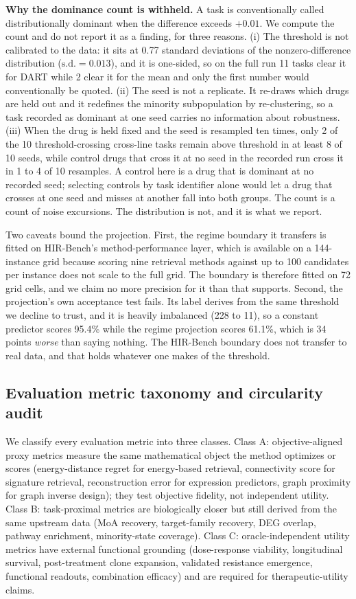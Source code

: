 \documentclass[11pt,letterpaper]{article}
\newcommand{\CONTROLRANGE}{1 to 4}
\begin{document}
\textbf{Why the dominance count is withheld.} A task is conventionally called
distributionally dominant when the difference exceeds $+0.01$. We compute the count and do
not report it as a finding, for three reasons. (i) The threshold is not calibrated to the
data: it sits at 0.77 standard deviations of the nonzero-difference distribution
($\mathrm{s.d.} = 0.013$), and it is one-sided, so on the full run 11 tasks clear it for DART
while 2 clear it for the mean and only the first number would conventionally be quoted.
(ii) The seed is not a replicate. It re-draws which drugs are held out and it redefines the
minority subpopulation by re-clustering, so a task recorded as dominant at one seed carries
no information about robustness. (iii) When the drug is held fixed and the seed is resampled
ten times, only 2 of the 10 threshold-crossing cross-line tasks remain above threshold in at
least 8 of 10 seeds, while control drugs that cross it at no seed in the recorded run cross
it in \CONTROLRANGE{} of 10 resamples. A control here is a drug that is dominant at no
recorded seed; selecting controls by task identifier alone would let a drug that crosses at
one seed and misses at another fall into both groups. The count is a count of noise
excursions. The distribution is not, and it is what we report.

Two caveats bound the projection. First, the regime boundary it
transfers is fitted on HIR-Bench's method-performance layer, which is available on a
144-instance grid because scoring nine retrieval methods against up to 100 candidates per
instance does not scale to the full grid. The boundary is therefore fitted on 72 grid cells,
and we claim no more precision for it than that supports. Second, the projection's own
acceptance test fails. Its label derives from the same threshold we decline to trust, and it is heavily imbalanced
(228 to 11), so a constant predictor scores 95.4\% while the regime projection scores 61.1\%,
which is 34 points \emph{worse} than saying nothing. The HIR-Bench boundary does not transfer
to real data, and that holds whatever one makes of the threshold.

\subsection*{Evaluation metric taxonomy and circularity audit}

We classify every evaluation metric into three classes. Class A: objective-aligned
proxy metrics measure the same mathematical object the method optimizes or scores (energy-distance
regret for energy-based retrieval, connectivity score for signature retrieval, reconstruction
error for expression predictors, graph proximity for graph inverse design); they test
objective fidelity, not independent utility. Class B: task-proximal metrics are
biologically closer but still derived from the same upstream data (MoA recovery,
target-family recovery, DEG overlap, pathway enrichment, minority-state coverage).
Class C: oracle-independent utility metrics have external functional grounding
(dose-response viability, longitudinal survival, post-treatment clone expansion, validated
resistance emergence, functional readouts, combination efficacy) and are required for
therapeutic-utility claims.
\end{document}
